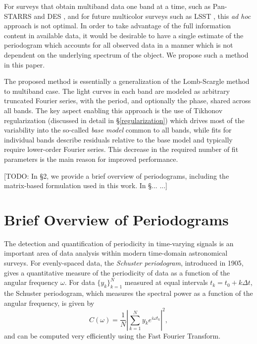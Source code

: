 \documentclass[12pt,preprint]{aastex}
\newcommand{\todo}[1]{{\color{red} [TODO: #1]}}
\newcommand{\foreign}[1]{{\it #1}}
\newcommand{\adhoc}{\foreign{ad hoc}}
\newcommand{\eqlabel}[1]{\label{eq:#1}}
\begin{document}
For surveys that obtain multiband data one band at a time, such as Pan-STARRS \citep{Kaiser2010} and DES \citep{Flaugher08},
and for future multicolor surveys such as LSST \citep{Ivezic08LSST}, this \adhoc{} approach is not optimal. In order to take 
advantage of the full information content in available data, it would be desirable to have a single estimate of the periodogram 
which accounts for all observed data in a manner which is not dependent on the underlying spectrum of the object. 
We propose such a method in this paper. 

The proposed method is essentially a generalization of the Lomb-Scargle method to 
multiband case. The light curves in  each band are modeled as arbitrary truncated Fourier series, 
with the period, and optionally the phase, shared across all bands. The key aspect enabling this approach is the use of Tikhonov regularization 
(discussed in detail in \S \ref{regularization}) which drives most of the variability into the so-called {\it base 
model} common to all bands, while fits for individual bands describe residuals relative to the base model 
and typically require lower-order Fourier series. This decrease in the required number of fit parameters is the
main reason for improved performance. 

\todo{In \S 2, we provide a brief overview of periodograms, including the matrix-based formulation used in this work. In \S... \citet[][hereafter S10]{Sesar2010}...}



\section{Brief Overview of Periodograms \label{sec:periodograms}} 

The detection and quantification of periodicity in time-varying signals is an important area of data analysis within modern time-domain astronomical surveys.
For evenly-spaced data, the {\it Schuster periodogram}, introduced in 1905, gives a quantitative measure of the periodicity of data as a function of the angular frequency $\omega$. For data $\{y_k\}_{k=1}^N$ measured at equal intervals $t_k = t_0 + k\Delta t$, the Schuster periodogram, which measures the spectral power as a function of the angular frequency, is given by
\begin{equation}
  \eqlabel{Schuster}
  C(\omega) = \frac{1}{N}\left| \sum_{k=1}^N y_k e^{i\omega t_k} \right|^2,
\end{equation}
and can be computed very efficiently using the Fast Fourier Transform.
\end{document}
